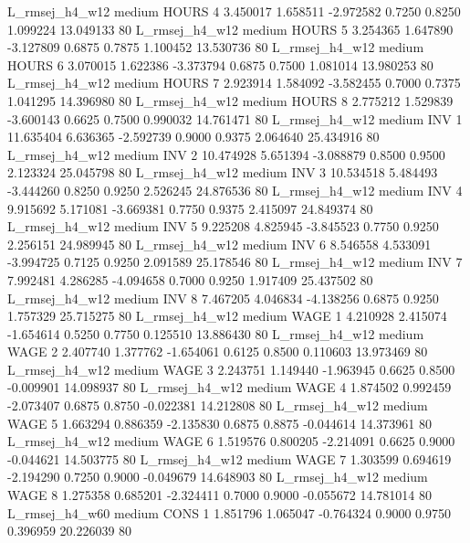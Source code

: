 L_rmsej_h4_w12     medium    HOURS                 4  3.450017 1.658511 -2.972582 0.7250 0.8250  1.099224   13.049133 80
L_rmsej_h4_w12     medium    HOURS                 5  3.254365 1.647890 -3.127809 0.6875 0.7875  1.100452   13.530736 80
L_rmsej_h4_w12     medium    HOURS                 6  3.070015 1.622386 -3.373794 0.6875 0.7500  1.081014   13.980253 80
L_rmsej_h4_w12     medium    HOURS                 7  2.923914 1.584092 -3.582455 0.7000 0.7375  1.041295   14.396980 80
L_rmsej_h4_w12     medium    HOURS                 8  2.775212 1.529839 -3.600143 0.6625 0.7500  0.990032   14.761471 80
L_rmsej_h4_w12     medium      INV                 1 11.635404 6.636365 -2.592739 0.9000 0.9375  2.064640   25.434916 80
L_rmsej_h4_w12     medium      INV                 2 10.474928 5.651394 -3.088879 0.8500 0.9500  2.123324   25.045798 80
L_rmsej_h4_w12     medium      INV                 3 10.534518 5.484493 -3.444260 0.8250 0.9250  2.526245   24.876536 80
L_rmsej_h4_w12     medium      INV                 4  9.915692 5.171081 -3.669381 0.7750 0.9375  2.415097   24.849374 80
L_rmsej_h4_w12     medium      INV                 5  9.225208 4.825945 -3.845523 0.7750 0.9250  2.256151   24.989945 80
L_rmsej_h4_w12     medium      INV                 6  8.546558 4.533091 -3.994725 0.7125 0.9250  2.091589   25.178546 80
L_rmsej_h4_w12     medium      INV                 7  7.992481 4.286285 -4.094658 0.7000 0.9250  1.917409   25.437502 80
L_rmsej_h4_w12     medium      INV                 8  7.467205 4.046834 -4.138256 0.6875 0.9250  1.757329   25.715275 80
L_rmsej_h4_w12     medium     WAGE                 1  4.210928 2.415074 -1.654614 0.5250 0.7750  0.125510   13.886430 80
L_rmsej_h4_w12     medium     WAGE                 2  2.407740 1.377762 -1.654061 0.6125 0.8500  0.110603   13.973469 80
L_rmsej_h4_w12     medium     WAGE                 3  2.243751 1.149440 -1.963945 0.6625 0.8500 -0.009901   14.098937 80
L_rmsej_h4_w12     medium     WAGE                 4  1.874502 0.992459 -2.073407 0.6875 0.8750 -0.022381   14.212808 80
L_rmsej_h4_w12     medium     WAGE                 5  1.663294 0.886359 -2.135830 0.6875 0.8875 -0.044614   14.373961 80
L_rmsej_h4_w12     medium     WAGE                 6  1.519576 0.800205 -2.214091 0.6625 0.9000 -0.044621   14.503775 80
L_rmsej_h4_w12     medium     WAGE                 7  1.303599 0.694619 -2.194290 0.7250 0.9000 -0.049679   14.648903 80
L_rmsej_h4_w12     medium     WAGE                 8  1.275358 0.685201 -2.324411 0.7000 0.9000 -0.055672   14.781014 80
L_rmsej_h4_w60     medium     CONS                 1  1.851796 1.065047 -0.764324 0.9000 0.9750  0.396959   20.226039 80

